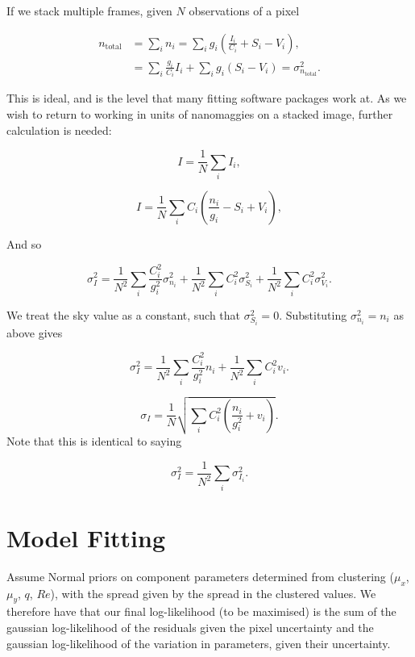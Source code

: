 \documentclass[../main.tex]{subfiles}
\begin{document}
If we stack multiple frames, given $N$ observations of a pixel

\begin{equation}
  \begin{aligned}
n_\mathrm{total} &= \sum_i{n_i} = \sum_i g_i\left(\frac{I_i}{C_i} + S_i - V_i\right),\\
                 &= \sum_{i}\frac{g_i}{C_i}I_i + \sum_i{g_i \left(S_i - V_i\right)} = \sigma_{n_\mathrm{total}}^2.
  \end{aligned}
\end{equation}

This is ideal, and is the level that many fitting software packages work at. As we wish to return to working in units of nanomaggies on a stacked image, further calculation is needed:

\begin{equation}
I = \frac{1}{N}\sum_i I_i,
\end{equation}

\begin{equation}
I = \frac{1}{N}\sum_i C_i\left(\frac{n_i}{g_i} - S_i + V_i\right),
\end{equation}

And so

\begin{equation}
  \sigma_I^2 = \frac{1}{N^2}\sum_i\frac{C_i^2}{g_i^2}\sigma_{n_i}^2 + \frac{1}{N^2}\sum_i C_i^2 \sigma_{S_i}^2 + \frac{1}{N^2}\sum_i C_i^2 \sigma_{V_i}^2.
\end{equation}

We treat the sky value as a constant, such that $\sigma_{S_i}^2 = 0$. Substituting $\sigma_{n_i}^2 = n_i$ as above gives

\begin{equation}
  \sigma_I^2 = \frac{1}{N^2}\sum_i\frac{C_i^2}{g_i^2}n_i + \frac{1}{N^2}\sum_i C_i^2 v_i.
\end{equation}

\begin{equation}
  \sigma_I = \frac{1}{N}\sqrt{\sum_i C_i^2\left(\frac{n_i}{g_i^2} + v_i\right)}.
\end{equation}
Note that this is identical to saying

\begin{equation}
\sigma_I^2 = \frac{1}{N^2}\sum_i\sigma_{I_i}^2.
\end{equation}


\section{Model Fitting}
\label{sec:appendix_model_fitting}
Assume Normal priors on component parameters determined from clustering ($\mu_x$, $\mu_y$, $q$, $Re$), with the spread given by the spread in the clustered values. We therefore have that our final log-likelihood (to be maximised) is the sum of the gaussian log-likelihood of the residuals given the pixel uncertainty and the gaussian log-likelihood of the variation in parameters, given their uncertainty.
\end{document}
